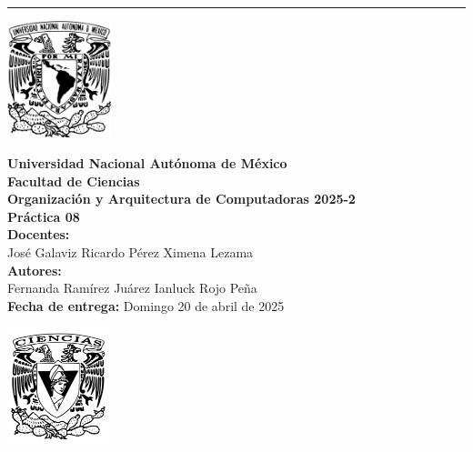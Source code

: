 \documentclass[12pt,letterpaper]{article}
\begin{document}
\hrule height 0.1pt
\bigskip
\begin{center}
  \begin{minipage}{3cm}
    \begin{center}
      \includegraphics[height=3.4cm]{../unam_logo.png}
    \end{center}
  \end{minipage}\hfill
  \begin{minipage}{10cm}
    \begin{center}
      \textbf{\Large Universidad Nacional Autónoma de México}\\[0.2cm]
      \textbf{\large Facultad de Ciencias}\\[0.2cm]
      \textbf{Organización y Arquitectura de Computadoras 2025-2}\\[0.4cm]
      \textbf{\Large Práctica 08}\\[0.1cm]
      \textbf{Docentes:}\\
      José Galaviz \hspace{1em} Ricardo Pérez \hspace{1em} Ximena Lezama\\[0.3cm]
      \textbf{Autores:}\\
      Fernanda Ramírez Juárez \quad Ianluck Rojo Peña\\[0.3cm]
      \textbf{Fecha de entrega:} Domingo 20 de abril de 2025
    \end{center}
  \end{minipage}\hfill
  \begin{minipage}{3cm}
    \begin{center}
      \includegraphics[height=3.4cm]{../fc_logo.png}
    \end{center}
  \end{minipage}
\end{center}
\end{document}
